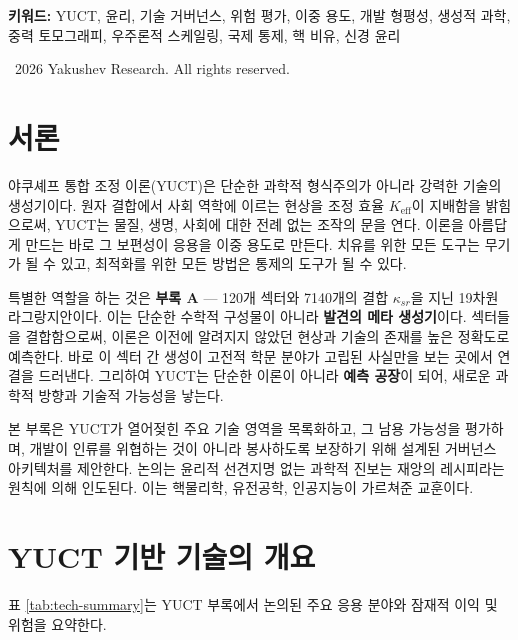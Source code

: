 \documentclass[12pt,a4paper]{article}
\theoremstyle{remark}
\newcommand{\Keff}{K_{\mathrm{eff}}}
\begin{document}
\begin{titlepage}
\begin{center}
			\vspace{1cm}
			
			\noindent
			\small\textbf{키워드:} YUCT, 윤리, 기술 거버넌스, 위험 평가, 이중 용도, 개발 형평성, 생성적 과학, 중력 토모그래피, 우주론적 스케일링, 국제 통제, 핵 비유, 신경 윤리
			
			\vspace{0.5cm}
			
			\noindent
			\textcopyright\ 2026 Yakushev Research. All rights reserved.
		\end{center}
	\end{titlepage}
	
	\tableofcontents
	\newpage
	
	\section{서론}
	\label{sec:intro}
	
	야쿠셰프 통합 조정 이론(YUCT)은 단순한 과학적 형식주의가 아니라 강력한 기술의 생성기이다. 원자 결합에서 사회 역학에 이르는 현상을 조정 효율 \(\Keff\)이 지배함을 밝힘으로써, YUCT는 물질, 생명, 사회에 대한 전례 없는 조작의 문을 연다. 이론을 아름답게 만드는 바로 그 보편성이 응용을 이중 용도로 만든다. 치유를 위한 모든 도구는 무기가 될 수 있고, 최적화를 위한 모든 방법은 통제의 도구가 될 수 있다.
	
	특별한 역할을 하는 것은 \textbf{부록 A} — 120개 섹터와 7140개의 결합 \(\kappa_{sr}\)을 지닌 19차원 라그랑지안이다. 이는 단순한 수학적 구성물이 아니라 \textbf{발견의 메타 생성기}이다. 섹터들을 결합함으로써, 이론은 이전에 알려지지 않았던 현상과 기술의 존재를 높은 정확도로 예측한다. 바로 이 섹터 간 생성이 고전적 학문 분야가 고립된 사실만을 보는 곳에서 연결을 드러낸다. 그리하여 YUCT는 단순한 이론이 아니라 \textbf{예측 공장}이 되어, 새로운 과학적 방향과 기술적 가능성을 낳는다.
	
	본 부록은 YUCT가 열어젖힌 주요 기술 영역을 목록화하고, 그 남용 가능성을 평가하며, 개발이 인류를 위협하는 것이 아니라 봉사하도록 보장하기 위해 설계된 거버넌스 아키텍처를 제안한다. 논의는 윤리적 선견지명 없는 과학적 진보는 재앙의 레시피라는 원칙에 의해 인도된다. 이는 핵물리학, 유전공학, 인공지능이 가르쳐준 교훈이다.
	
	\section{YUCT 기반 기술의 개요}
	\label{sec:overview}
	
	표 \ref{tab:tech-summary}는 YUCT 부록에서 논의된 주요 응용 분야와 잠재적 이익 및 위험을 요약한다.
	
\end{document}
